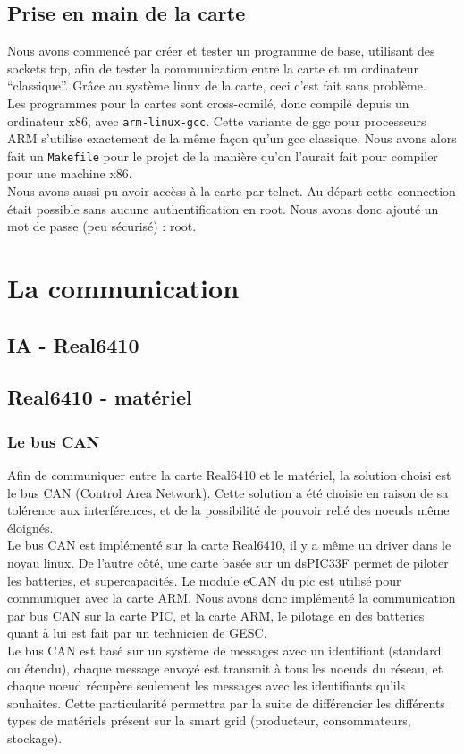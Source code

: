 \documentclass[a4,french,12pt]{article}
\begin{document}
\subsection{Prise en main de la carte}
Nous avons commencé par créer et tester un programme de base, utilisant des sockets tcp, afin de tester la communication entre 
la carte et un ordinateur ``classique''. Grâce au système linux de la carte, ceci c'est fait sans problème. \\
Les programmes pour la cartes sont cross-comilé, donc compilé depuis un ordinateur x86, avec \texttt{arm-linux-gcc}. Cette 
variante de ggc pour processeurs ARM s'utilise exactement de la même façon qu'un gcc classique. Nous avons alors fait un 
\texttt{Makefile} pour le projet de la manière qu'on l'aurait fait pour compiler pour une machine x86. \\
Nous avons aussi pu avoir accèss à la carte par telnet. Au départ cette connection était possible sans aucune authentification 
en root. Nous avons donc ajouté un mot de passe (peu sécurisé) : root.

\newpage
\section{La communication}
\subsection{IA - Real6410}

\subsection{Real6410 - matériel}
\subsubsection{Le bus CAN}
Afin de communiquer entre la carte Real6410 et le matériel, la solution choisi est le bus CAN (Control Area Network). Cette 
solution a été choisie en raison de sa tolérence aux interférences, et de la possibilité de pouvoir relié des noeuds même 
éloignés. \\
Le bus CAN est implémenté sur la carte Real6410, il y a même un driver dans le noyau linux. De l'autre côté, une carte 
basée sur un dsPIC33F permet de piloter les batteries, et supercapacités. Le module eCAN du pic est utilisé pour 
communiquer avec la carte ARM. Nous avons donc implémenté la communication par bus CAN sur la carte PIC, et la carte ARM, 
le pilotage en des batteries quant à lui est fait par un technicien de GESC. \\
Le bus CAN est basé sur un système de messages avec un identifiant (standard ou étendu), chaque message envoyé est transmit 
à tous les noeuds du réseau, et chaque noeud récupère seulement les messages avec les identifiants qu'ils souhaites. Cette 
particularité permettra par la suite de différencier les différents types de matériels présent sur la smart grid 
(producteur, consommateurs, stockage).
\end{document}
